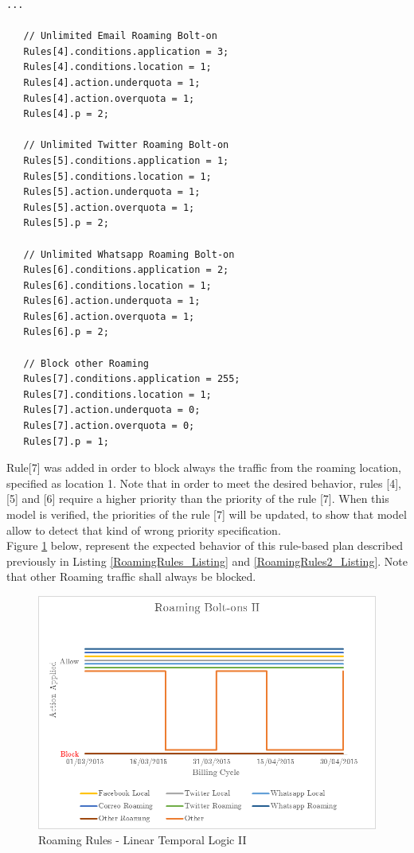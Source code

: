 \singlespacing
\begin{lstlisting}[caption=Core-Rules-based Roaming Plan Model - II,
  label=RoamingRules2_Listing]
   ...
   
   // Unlimited Email Roaming Bolt-on
   Rules[4].conditions.application = 3;
   Rules[4].conditions.location = 1;
   Rules[4].action.underquota = 1;
   Rules[4].action.overquota = 1;
   Rules[4].p = 2;

   // Unlimited Twitter Roaming Bolt-on
   Rules[5].conditions.application = 1;
   Rules[5].conditions.location = 1;
   Rules[5].action.underquota = 1;
   Rules[5].action.overquota = 1;
   Rules[5].p = 2;

   // Unlimited Whatsapp Roaming Bolt-on
   Rules[6].conditions.application = 2;
   Rules[6].conditions.location = 1;
   Rules[6].action.underquota = 1;
   Rules[6].action.overquota = 1;
   Rules[6].p = 2;
   
   // Block other Roaming
   Rules[7].conditions.application = 255;
   Rules[7].conditions.location = 1;
   Rules[7].action.underquota = 0;
   Rules[7].action.overquota = 0;
   Rules[7].p = 1;

\end{lstlisting}
\doublespacing

Rule[7] was added in order to block always the traffic from the roaming location, specified as location 1. Note that in order to meet the desired behavior, rules [4], [5] and [6] require a higher priority than the priority of the rule [7]. When this model is verified, the priorities of the rule [7] will be updated, to show that model allow to detect that kind of wrong priority specification.\\

Figure \ref{roamingRules2} below, represent the expected behavior of this rule-based plan described previously in Listing \ref{RoamingRules_Listing} and \ref{RoamingRules2_Listing}. Note that other Roaming traffic shall always be blocked. \\

\begin{figure}[H]
\centering
\includegraphics[width=1.00\textwidth]{image/Plans_RoamingRules2}
\caption{Roaming Rules - Linear Temporal Logic II}
\label{roamingRules2}
\end{figure}

